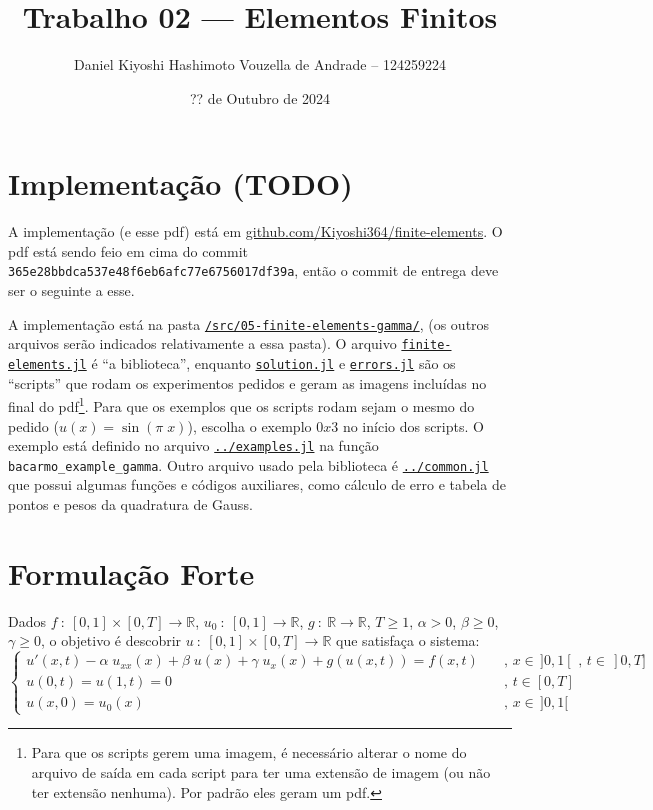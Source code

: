 \documentclass[a4paper]{article}
\title{Trabalho 02 --- Elementos Finitos}
\author{Daniel Kiyoshi Hashimoto Vouzella de Andrade -- 124259224}
\date{?? de Outubro de 2024}
\newcommand{\linkfileraw}[2]{\href{run:../../#1}{\texttt{#2}}}
\newcommand{\linkfile}[2][src/05-finite-elements-gamma/]{\linkfileraw{#1#2}{#2}}
\newcommand{\typ}{\::\:}
\begin{document}
\maketitle

\setcounter{section}{-1}
\section{Implementação (TODO)}

A implementação (e esse pdf) está em
\href{https://github.com/Kiyoshi364/finite-elements}{github.com/Kiyoshi364/finite-elements}.
O pdf está sendo feio em cima do commit
\texttt{365e28bbdca537e48f6eb6afc77e6756017df39a},
então o commit de entrega deve ser o seguinte a esse.

A implementação está na pasta
\linkfileraw{/src/05-finite-elements-gamma/}{/src/05-finite-elements-gamma/},
(os outros arquivos serão indicados
relativamente a essa pasta).
O arquivo \linkfile{finite-elements.jl}
é ``a biblioteca'',
enquanto
\linkfile{solution.jl} e \linkfile{errors.jl}
são os ``scripts'' que rodam os experimentos pedidos
e geram as imagens incluídas no final do pdf\footnote{
Para que os scripts gerem uma imagem,
é necessário alterar o nome do arquivo de saída
em cada script para ter uma extensão de imagem
(ou não ter extensão nenhuma).
Por padrão eles geram um pdf.
}.
Para que os exemplos que os scripts rodam
sejam o mesmo do pedido
(\(u(x) = \sin(\pi \; x)\)),
escolha o exemplo \(0x3\)
no início dos scripts.
O exemplo está definido
no arquivo
\linkfile{../examples.jl}
na função \texttt{bacarmo\_example\_gamma}.
Outro arquivo usado pela biblioteca é
\linkfile{../common.jl}
que possui algumas funções e códigos auxiliares,
como cálculo de erro e
tabela de pontos e pesos da quadratura de Gauss.

\section{Formulação Forte}

Dados
\(f \typ [0, 1] \times [0, T] \to \mathbb{R}\),
\(u_0 \typ [0, 1] \to \mathbb{R}\),
\(g \typ \mathbb{R} \to \mathbb{R}\),
\(T \ge 1\),
\(\alpha > 0\),
\(\beta \ge 0\),
\(\gamma \ge 0\),
o objetivo é descobrir \(u \typ [0, 1] \times [0, T] \to \mathbb{R}\)
que satisfaça o sistema:
\[ \begin{cases}
        u'(x, t) - \alpha \; u_{xx}(x) + \beta \; u(x) + \gamma \; u_{x}(x) + g(u(x, t))= f(x, t)
            &\quad\text{, } x \in \,]0, 1[ \text{ , } t \in \,]0, T]
        \\
        u(0, t) = u(1, t) = 0
            &\quad\text{, } t \in [0, T]
        \\
        u(x, 0) = u_0(x)
            &\quad\text{, } x \in \,]0, 1[
\end{cases} \]
\end{document}
